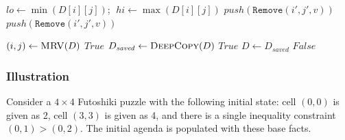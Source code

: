 \begin{algorithm}[H]
\caption{Inequality Propagation (Rule R5)}
\label{alg:mac-ineq}
\begin{algorithmic}[1]
    \State $\mathit{lo} \gets \min(D[i][j])$;
           $\;\mathit{hi} \gets \max(D[i][j])$
                \State $\mathit{push}(\texttt{Remove}(i',j',v))$
            \EndFor
                \State $\mathit{push}(\texttt{Remove}(i',j',v))$
            \EndFor
        \EndIf
    \EndFor
\EndFunction
\end{algorithmic}
\end{algorithm}

\begin{algorithm}[H]
\caption{MAC Backtracking with MRV}
\label{alg:mac-bt}
\begin{algorithmic}[1]
    \State $(i,j) \gets \Call{MRV}{D}$
     \Return $\mathit{True}$ \EndIf
        \State $D_{\mathit{saved}} \gets \Call{DeepCopy}{D}$
             \Return $\mathit{True}$ \EndIf
        \EndIf
        \State $D \gets D_{\mathit{saved}}$
    \EndFor
    \State \Return $\mathit{False}$
\EndFunction
\end{algorithmic}
\end{algorithm}

\subsubsection{Illustration}

Consider a $4 \times 4$ Futoshiki puzzle with the following initial state: cell $(0,0)$ is given as 2, cell $(3,3)$ is given as 4, and there is a single inequality constraint $(0,1) > (0,2)$. The initial agenda is populated with these base facts.

